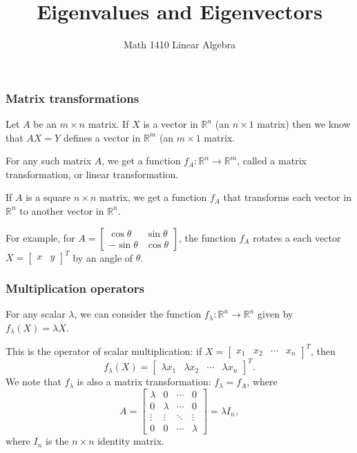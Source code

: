\documentclass[11pt,t]{beamer}
\date{}
\author{Math 1410 Linear Algebra}
\title{Eigenvalues and Eigenvectors}
\newcommand{\R}{\mathbb{R}}
\begin{document}
\begin{frame}
\titlepage
\end{frame}


\begin{frame}
\frametitle{Matrix transformations}
Let $A$ be an $m\times n$ matrix. If $X$ is a vector in $\R^n$ (an $n\times 1$ matrix) then we know that $AX=Y$ defines a vector in $\R^m$ (an $m\times 1$ matrix.

For any such matrix $A$, we get a \alert{function} $f_A:\R^n\to\R^m$, called a \alert{matrix transformation}, or \alert{linear transformation}.

\bigskip

If $A$ is a \alert{square} $n\times n$ matrix, we get a function $f_A$ that transforms each vector in $\R^n$ to another vector in $\R^n$. 

\bigskip


For example, for $A = \begin{bmatrix}
\cos \theta &\sin\theta\\-\sin\theta & \cos\theta
\end{bmatrix}$, the function $f_A$ rotates a each vector $X = \begin{bmatrix}
x&y
\end{bmatrix}^T$ by an angle of $\theta$.

\end{frame}
\begin{frame}
\frametitle{Multiplication operators}

For any scalar $\lambda$, we can consider the function $f_\lambda:\R^n\to\R^n$ given by $f_\lambda(X) = \lambda X$.

\medskip

This is the operator of scalar multiplication: if $X = \begin{bmatrix}x_1&x_2&\cdots & x_n\end{bmatrix}^T$, then
\[
f_\lambda(X) = \begin{bmatrix}\lambda x_1&\lambda x_2&\cdots & \lambda x_n\end{bmatrix}^T.
\]
We note that $f_\lambda$ is also a matrix transformation: $f_\lambda=f_A$, where
\[
A = \begin{bmatrix}\lambda & 0 & \cdots &  0\\0&\lambda &\cdots & 0\\\vdots & \vdots &\ddots &\vdots \\0&0&\cdots &\lambda\end{bmatrix} = \lambda I_n,
\]
where $I_n$ is the $n\times n$ identity matrix.
\end{frame}
\end{document}
